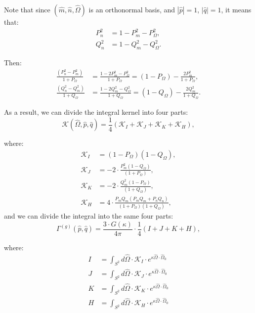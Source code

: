 Note that since $(\hat{m}, \hat{n}, \hat{\Omega})$ is an orthonormal basis, and $|\hat{p}| = 1$, $|\hat{q}| = 1$, it means that:
\begin{align*}
    P_n^2 &= 1 - P_m^2 - P_{\Omega}^2, \\
    Q_n^2 &= 1 - Q_m^2 - Q_{\Omega}^2.
\end{align*}

Then:
\begin{align*}
\frac{(P_n^2 - P_m^2)}{1 + P_{\Omega}} &= \frac{1 - 2 P_m^2 - P_{\Omega}^2}{1 + P_{\Omega}} = (1 - P_{\Omega}) - \frac{2 P_m^2}{1 + P_{\Omega}}, \\
\frac{(Q_n^2 - Q_m^2)}{1 + Q_{\Omega}} &= \frac{1 - 2 Q_m^2 - Q_{\Omega}^2}{1 + Q_{\Omega}} = (1 - Q_{\Omega}) - \frac{2Q_m^2}{1 + Q_{\Omega}}.
\end{align*}

As a result, we can divide the integral kernel into four parts:
\begin{equation}
\mathcal{K}(\hat{\Omega},\hat{p}, \hat{q}) = \frac{1}{4}(\mathcal{K}_{I} + \mathcal{K}_{J} + \mathcal{K}_{K} + \mathcal{K}_{H}),
\end{equation}

where:
\begin{subequations}
\begin{align}
\mathcal{K}_{I} &= (1 - P_{\Omega})(1 - Q_{\Omega}), \\
\mathcal{K}_{J} &=  - 2 \cdot \frac{P_m^2 (1 - Q_{\Omega})}{(1+P_{\Omega})}, \\
\mathcal{K}_{K} &=  - 2 \cdot \frac{Q_m^2 (1 - P_{\Omega})}{(1+Q_{\Omega})}, \\
\mathcal{K}_{H} &= 4 \cdot \frac{P_m Q_m (P_m Q_m + P_n Q_n)}{(1+P_{\Omega})(1+Q_{\Omega})},
\end{align}
\end{subequations}
and we can divide the integral into the same four parts:
\begin{equation}
\Gamma^{(g)}(\hat{p}, \hat{q}) = \frac{3 \cdot G (\kappa)}{4\pi} \cdot \frac{1}{4} \left( I + J + K + H \right),
\end{equation}

where:
\begin{subequations}
\begin{align}
I &= \int_{S^2} d\hat{\Omega} \cdot \mathcal{K}_{I} \cdot e^{\kappa \hat{\Omega} \cdot \hat{\Omega}_0} \\
J &= \int_{S^2} d\hat{\Omega} \cdot \mathcal{K}_{J} \cdot e^{\kappa \hat{\Omega} \cdot \hat{\Omega}_0} \\
K &= \int_{S^2} d\hat{\Omega} \cdot \mathcal{K}_{K} \cdot e^{\kappa \hat{\Omega} \cdot \hat{\Omega}_0} \\
H &= \int_{S^2} d\hat{\Omega} \cdot \mathcal{K}_{H} \cdot e^{\kappa \hat{\Omega} \cdot \hat{\Omega}_0}
\end{align}
\end{subequations}

